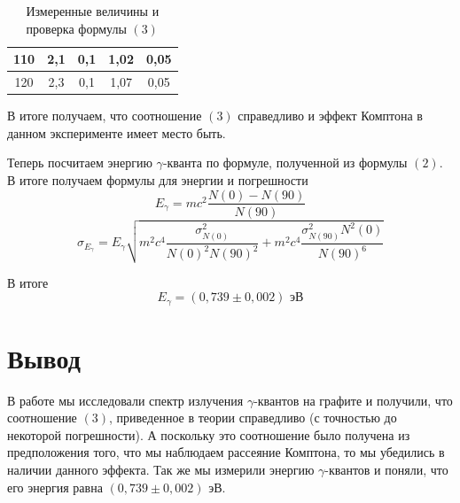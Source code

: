 \documentclass[a4paper, 12pt]{article}%
\begin{document}
\begin{table}[h!]
\begin{center}
\begin{tabular}{|c|c|c|c|c|}
110            & 2,1                                             & 0,1                                                                    & 1,02                                                            & 0,05                                                                     \\ \hline
120            & 2,3                                             & 0,1                                                                    & 1,07                                                            & 0,05                                                                     \\ \hline
\end{tabular}
\caption{Измеренные величины и проверка формулы $(3)$}
\end{center}
\end{table}
\newpage
В итоге получаем, что соотношение $(3)$ справедливо и эффект Комптона в данном эксперименте имеет место быть.

Теперь посчитаем энергию $\gamma$-кванта по формуле, полученной из формулы $(2)$. В итоге получаем формулы для энергии и погрешности
\begin{equation}
E_{\gamma} = mc^2 \frac{N(0) - N(90)}{N(90)}
\end{equation}
\[\sigma_{E_{\gamma}} = E_{\gamma} \sqrt{m^2c^4\frac{\sigma_{N(0)}^2}{N(0)^2 N(90)^2} + m^2c^4 \frac{\sigma_{N(90)}^2N^2(0)}{N(90)^6}}\]

В итоге 
\[E_{\gamma} = (0,739 \pm 0,002) \text{ эВ}\]
\section{Вывод} В работе мы исследовали спектр излучения $\gamma$-квантов на графите и получили, что соотношение $(3)$, приведенное в теории справедливо (с точностью до некоторой погрешности). А поскольку это соотношение было получена из предположения того, что мы наблюдаем рассеяние Комптона, то мы убедились в наличии данного эффекта. Так же мы измерили энергию $\gamma$-квантов и поняли, что его энергия равна $(0,739 \pm 0,002) \text{ эВ}$.
\end{document}
